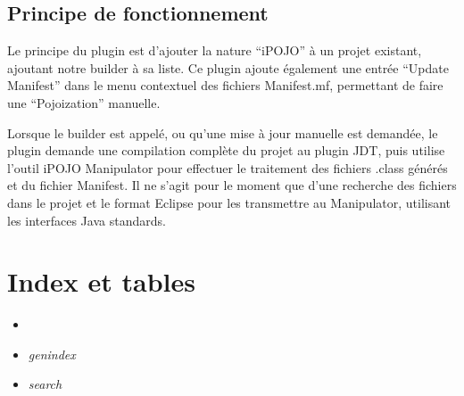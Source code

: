 \documentclass[letterpaper,10pt,french]{sphinxmanual}
\begin{document}
\section{Principe de fonctionnement}
\label{user/index:principe-de-fonctionnement}
Le principe du plugin est d'ajouter la nature ``iPOJO'' à un projet existant,
ajoutant notre builder à sa liste.
Ce plugin ajoute également une entrée ``Update Manifest'' dans le menu contextuel
des fichiers Manifest.mf, permettant de faire une ``Pojoization'' manuelle.

Lorsque le builder est appelé, ou qu'une mise à jour manuelle est demandée, le
plugin demande une compilation complète du projet au plugin JDT, puis utilise
l'outil iPOJO Manipulator pour effectuer le traitement des fichiers .class
générés et du fichier Manifest.
Il ne s'agit pour le moment que d'une recherche des fichiers dans le projet et
le format Eclipse pour les transmettre au Manipulator, utilisant les interfaces
Java standards.


\chapter{Index et tables}
\label{index:index-et-tables}\begin{itemize}
\item {} 

\item {} 
\emph{genindex}

\item {} 
\emph{search}

\end{itemize}



\renewcommand{\indexname}{Index}
\printindex
\end{document}
